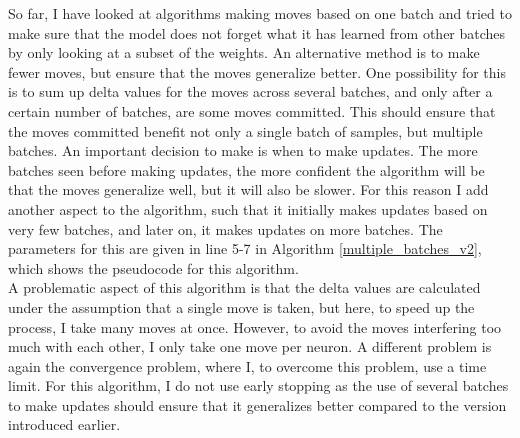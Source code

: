 \noindent So far, I have looked at algorithms making moves based on one batch and tried to make sure that the model does not forget what it has learned from other batches by only looking at a subset of the weights. An alternative method is to make fewer moves, but ensure that the moves generalize better. One possibility for this is to sum up delta values for the moves across several batches, and only after a certain number of batches, are some moves committed. This should ensure that the moves committed benefit not only a single batch of samples, but multiple batches. An important decision to make is when to make updates. The more batches seen before making updates, the more confident the algorithm will be that the moves generalize well, but it will also be slower. For this reason I add another aspect to the algorithm, such that it initially makes updates based on very few batches, and later on, it makes updates on more batches. The parameters for this are given in line 5-7 in Algorithm \ref{multiple_batches_v2}, which shows the pseudocode for this algorithm. \\

\noindent A problematic aspect of this algorithm is that the delta values are calculated under the assumption that a single move is taken, but here, to speed up the process, I take many moves at once. However, to avoid the moves interfering too much with each other, I only take one move per neuron. A different problem is again the convergence problem, where I, to overcome this problem, use a time limit. For this algorithm, I do not use early stopping as the use of several batches to make updates should ensure that it generalizes better compared to the version introduced earlier. 


